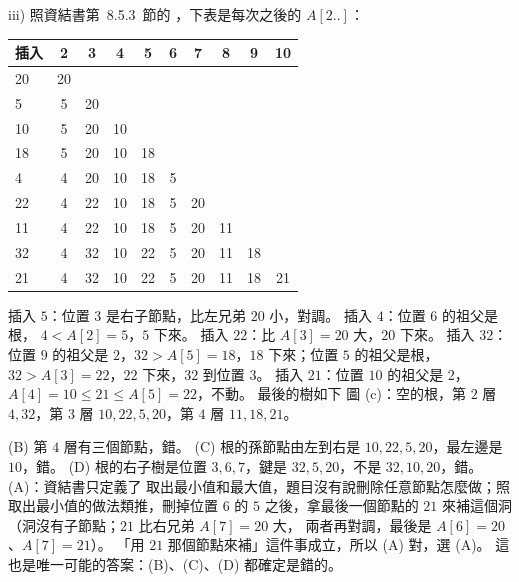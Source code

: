 \begin{pastsoln}
iii) 照資結書第~8.5.3~節的 ，下表是每次之後的 $A[2..]$：
\begin{center}
\small
\begin{tabular}{l*{9}{c}}
\toprule
插入 & 2 & 3 & 4 & 5 & 6 & 7 & 8 & 9 & 10 \\
\midrule
20 & 20 \\
5 & 5 & 20 \\
10 & 5 & 20 & 10 \\
18 & 5 & 20 & 10 & 18 \\
4 & 4 & 20 & 10 & 18 & 5 \\
22 & 4 & 22 & 10 & 18 & 5 & 20 \\
11 & 4 & 22 & 10 & 18 & 5 & 20 & 11 \\
32 & 4 & 32 & 10 & 22 & 5 & 20 & 11 & 18 \\
21 & 4 & 32 & 10 & 22 & 5 & 20 & 11 & 18 & 21 \\
\bottomrule
\end{tabular}
\end{center}
插入 $5$：位置 $3$ 是右子節點，比左兄弟 $20$ 小，對調。 插入 $4$：位置 $6$ 的祖父是根，
$4 < A[2] = 5$，$5$ 下來。 插入 $22$：比 $A[3] = 20$ 大，$20$ 下來。 插入 $32$：位置 $9$ 的祖父是
$2$，$32 > A[5] = 18$，$18$ 下來；位置 $5$ 的祖父是根，$32 > A[3] = 22$，$22$ 下來，$32$ 到位置
$3$。 插入 $21$：位置 $10$ 的祖父是 $2$，$A[4] = 10 \le 21 \le A[5] = 22$，不動。 最後的樹如下
圖 (c)：空的根，第 $2$ 層 $4, 32$，第 $3$ 層 $10, 22, 5, 20$，第 $4$ 層 $11, 18, 21$。

(B) 第 $4$ 層有三個節點，錯。 (C) 根的孫節點由左到右是 $10, 22, 5, 20$，最左邊是 $10$，錯。
(D) 根的右子樹是位置 $3, 6, 7$，鍵是 $32, 5, 20$，不是 $32, 10, 20$，錯。 (A)：資結書只定義了
取出最小值和最大值，題目沒有說刪除任意節點怎麼做；照取出最小值的做法類推，刪掉位置 $6$
的 $5$ 之後，拿最後一個節點的 $21$ 來補這個洞（洞沒有子節點；$21$ 比右兄弟 $A[7] = 20$ 大，
兩者再對調，最後是 $A[6] = 20$、$A[7] = 21$）。 「用 $21$ 那個節點來補」這件事成立，所以 (A)
對，選 (A)。 這也是唯一可能的答案：(B)、(C)、(D) 都確定是錯的。


\end{pastsoln}
